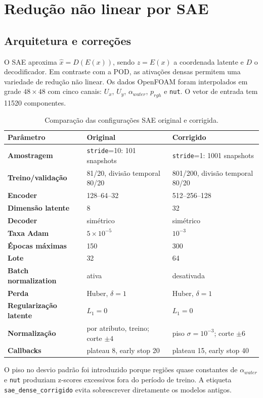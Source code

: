 \documentclass[12pt,a4paper]{article}
\newcommand{\code}[1]{\texttt{#1}}
\begin{document}
\section{Redução não linear por SAE}

\subsection{Arquitetura e correções}
O SAE aproxima $\widehat x=D(E(x))$, sendo $z=E(x)$ a coordenada latente e $D$ o decodificador. Em contraste com a POD, as ativações densas permitem uma variedade de redução não linear. Os dados OpenFOAM foram interpolados em grade $48\times48$ com cinco canais: $U_x$, $U_y$, $\alpha_{water}$, $p_{rgh}$ e \code{nut}. O vetor de entrada tem 11520 componentes.

\begin{table}[H]
\centering
\caption{Comparação das configurações SAE original e corrigida.}
\label{tab:saeparam}
\begin{tabularx}{\textwidth}{>{\bfseries}l X X}
\toprule
Parâmetro & Original & Corrigido\\
\midrule
Amostragem & \code{stride}=10: 101 snapshots & \code{stride}=1: 1001 snapshots\\
Treino/validação & 81/20, divisão temporal 80/20 & 801/200, divisão temporal 80/20\\
Encoder & 128--64--32 & 512--256--128\\
Dimensão latente & 8 & 32\\
Decoder & simétrico & simétrico\\
Taxa Adam & $5\times10^{-5}$ & $10^{-3}$\\
Épocas máximas & 150 & 300\\
Lote & 32 & 64\\
Batch normalization & ativa & desativada\\
Perda & Huber, $\delta=1$ & Huber, $\delta=1$\\
Regularização latente & $L_1=0$ & $L_1=0$\\
Normalização & por atributo, treino; corte $\pm4$ & piso $\sigma=10^{-3}$; corte $\pm6$\\
Callbacks & plateau 8, early stop 20 & plateau 15, early stop 40\\
\bottomrule
\end{tabularx}
\end{table}

O piso no desvio padrão foi introduzido porque regiões quase constantes de $\alpha_{water}$ e \code{nut} produziam z-scores excessivos fora do período de treino. A etiqueta \code{sae\_dense\_corrigido} evita sobrescrever diretamente os modelos antigos.
\end{document}
